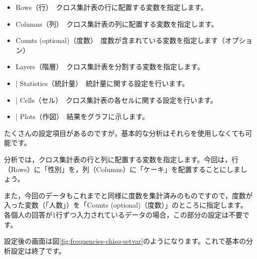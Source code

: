 \documentclass[
  12pt,
  a5jpaper,
  lualatex, ja=standard]{bxjsbook}
\providecommand{\tightlist}{%
  \setlength{\itemsep}{0pt}\setlength{\parskip}{0pt}}
\newenvironment{jmvsettings}{%
	\begin{center}%
	\begin{tcolorbox}[%
		title=設定項目,
		colframe=gmoji,
		colbacktitle=gmoji,
		colback=gmoji!2!white,
		breakable,
		width=.9\textwidth,
		]\small\addtolength{\leftmargini}{-3\labelsep}%
	}%
	{\end{tcolorbox}\end{center}}
\begin{document}
\begin{jmvsettings}

\begin{itemize}
\tightlist
\item
  Rows（行）　クロス集計表の行に配置する変数を指定します。
\item
  Columns（列）　クロス集計表の列に配置する変数を指定します。
\item
  Counts (optional)（度数）　度数が含まれている変数を指定します（オプション）
\item
  Layers（階層）　クロス集計表を分割する変数を指定します。
\item
  \colorbox{bar}{\textcolor{gmoji2}{| Statistics}}（統計量）　統計量に関する設定を行います。
\item
  \colorbox{bar}{\textcolor{gmoji2}{| Cells}}（セル）　クロス集計表の各セルに関する設定を行います。
\item
  \colorbox{bar}{\textcolor{gmoji2}{| Plots}}（作図）　結果をグラフに示します。
\end{itemize}

\end{jmvsettings}

たくさんの設定項目があるのですが，基本的な分析はそれらを使用しなくても可能です。

分析では，クロス集計表の行と列に配置する変数を指定します。今回は，行（Rows）に「性別」を，列（Columns）に「ケーキ」を配置することにしましょう。

また，今回のデータもこれまでと同様に度数を集計済みのものですので，度数が入った変数（「人数」）を「Counts (optional)（度数）」のところに指定します。各個人の回答が1行ずつ入力されているデータの場合，この部分の設定は不要です。

設定後の画面は図\ref{fig:frequencies-chisq-setvar}のようになります。これで基本の分析設定は終了です。
\end{document}
